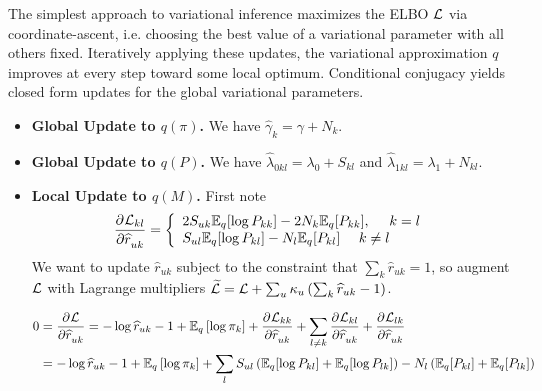 \documentclass{article}
\begin{document}
\newpage

 The simplest approach to variational inference maximizes the ELBO $\mathcal{L}$ via coordinate-ascent, i.e. choosing the best value of a variational parameter with all others fixed. Iteratively applying these updates, the variational approximation $q$ improves at every step toward some local optimum. Conditional conjugacy yields closed form updates for the global variational parameters. 

\begin{itemize}
\item {\bf Global Update to $q(\pi)$.} We have $\widehat \gamma_{k} = \gamma + N_k$.
\item {\bf Global Update to $q(P)$.} We have $\widehat \lambda_{0kl} = \lambda_0 + S_{kl}$ and $\widehat \lambda_{1kl} = \lambda_1 + N_{kl}$.
\item {\bf Local Update to $q(M)$.} First note 
$$ 
\frac{\partial^{}\mathcal{L}_{kl}}{\partial \widehat r_{uk}^{}} 
= \left\{
                \begin{array}{ll}
2S_{uk}\mathbb{E}_q[\log P_{kk}]
   - 2N_k \mathbb{E}_q[P_{kk}],
  ~~~~ k=l \\
S_{ul} \mathbb{E}_q[\log P_{kl}] - N_l\mathbb{E}_q[P_{kl}]
  ~~~~ k\neq l
                \end{array}
              \right.
$$
We want to update $\widehat r_{uk}$ subject to the constraint that $\sum_k \widehat r_{uk} = 1$, so augment $\mathcal{L}$ with Lagrange multipliers $\widetilde{\mathcal{L}} = \mathcal{L} + \sum_u\kappa_u\left(\sum_k \widehat r_{uk} - 1\right)$.

\begin{align*}
0 
&= \frac{\partial^{}\mathcal{L}}{\partial \widehat r_{uk}^{}}
= -\log \widehat r_{uk} - 1 + \mathbb{E}_q\left[\log \pi_k\right] + \frac{\partial^{}\mathcal{L}_{kk}}{\partial \widehat r_{uk}^{}} + \sum_{l\neq k}\frac{\partial^{}\mathcal{L}_{kl}}{\partial \widehat r_{uk}^{}} + \frac{\partial^{}\mathcal{L}_{lk}}{\partial \widehat r_{uk}^{}} \\
&= -\log \widehat r_{uk} - 1 + \mathbb{E}_q\left[\log \pi_k\right] + \sum_{l} S_{ul}\left(\mathbb{E}_q[\log P_{kl}] + \mathbb{E}_q[\log P_{lk}]\right) - N_l\left(\mathbb{E}_q[P_{kl}] + \mathbb{E}_q[P_{lk}]\right)\\
\end{align*}


\end{itemize}
\end{document}
